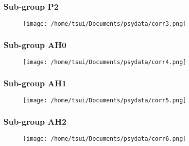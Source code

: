 \documentclass[11pt]{article}
\begin{document}
\subsubsection{Sub-group P2}
\label{sec-4-3-3}
\begin{figure}[htb]
\centering
\texttt{[image: /home/tsui/Documents/psydata/corr3.png]}
\label{P3-corrplot}
\end{figure}
\subsubsection{Sub-group AH0}
\label{sec-4-3-4}
\begin{figure}[htb]
\centering
\texttt{[image: /home/tsui/Documents/psydata/corr4.png]}
\label{AH0-corrplot}
\end{figure}
\subsubsection{Sub-group AH1}
\label{sec-4-3-5}
\begin{figure}[htb]
\centering
\texttt{[image: /home/tsui/Documents/psydata/corr5.png]}
\label{AH1-corrplot}
\end{figure}
\subsubsection{Sub-group AH2}
\label{sec-4-3-6}
\begin{figure}[htb]
\centering
\texttt{[image: /home/tsui/Documents/psydata/corr6.png]}
\label{AH2-corrplot}
\end{figure}
\end{document}
